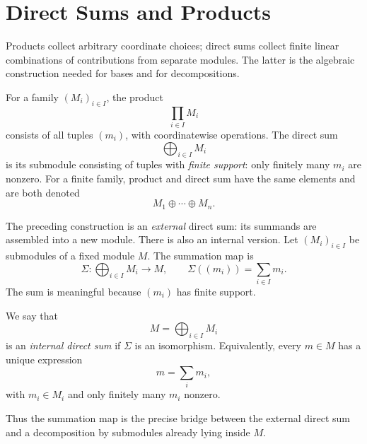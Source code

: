 \section{Direct Sums and Products}
Products collect arbitrary coordinate choices; direct sums collect finite
linear combinations of contributions from separate modules. The latter is the
algebraic construction needed for bases and for decompositions.

\begin{definition}
For a family \((M_i)_{i\in I}\), the product
\[
\prod_{i\in I}M_i
\]
consists of all tuples \((m_i)\), with coordinatewise operations. The direct
sum
\[
\bigoplus_{i\in I}M_i
\]
is its submodule consisting of
tuples with \emph{finite support}: only finitely many \(m_i\) are nonzero.
For a finite family, product and direct sum have the same elements and are
both denoted
\[
M_1\oplus\cdots\oplus M_n.
\]
\end{definition}

The preceding construction is an \emph{external} direct sum: its summands
are assembled into a new module. There is also an internal version. Let
\((M_i)_{i\in I}\) be submodules of a fixed module \(M\). The summation map is
\[
\Sigma:\bigoplus_{i\in I}M_i\longrightarrow M,
\qquad \Sigma((m_i))=\sum_{i\in I}m_i.
\]
The sum is meaningful because \((m_i)\) has finite support.

\begin{definition}
We say that
\[
M=\bigoplus_{i\in I}M_i
\]
is an \emph{internal direct sum} if \(\Sigma\) is an isomorphism.
Equivalently, every \(m\in M\) has a unique expression
\[
m=\sum_i m_i,
\]
with \(m_i\in M_i\) and only finitely many \(m_i\) nonzero.
\end{definition}

Thus the summation map is the precise bridge between the external direct sum
and a decomposition by submodules already lying inside \(M\).


